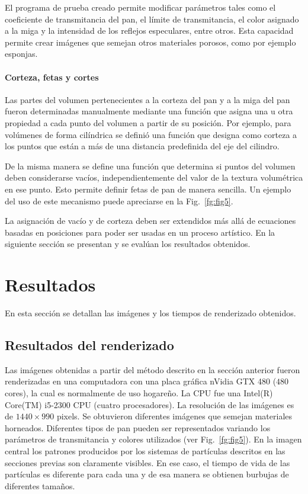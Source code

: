 \documentclass[oneside,a4paper,spanish,links]{amca}
\begin{document}
El programa de prueba creado permite modificar parámetros tales como
el coeficiente de transmitancia del pan, el límite de transmitancia,
el color asignado a la miga y la intensidad de los reflejos especulares,
entre otros. Esta capacidad permite crear imágenes que semejan otros
materiales porosos, como por ejemplo esponjas.

\paragraph{Corteza, fetas y cortes}

Las partes del volumen pertenecientes a la corteza del pan y a la miga
del pan fueron determinadas manualmente mediante una función que
asigna una u otra propiedad a cada punto del volumen a partir de su
posición. Por ejemplo, para volúmenes de forma cilíndrica se definió
una función que designa como corteza a los puntos que están a más de
una distancia predefinida del eje del cilindro.

De la misma manera se define una función que determina si puntos del
volumen deben considerarse vacíos, independientemente del valor de la
textura volumétrica en ese punto. Esto permite definir fetas de pan de
manera sencilla. Un ejemplo del uso de este mecanismo puede apreciarse
en la Fig.~\ref{fg:fig5}.

La asignación de vacío y de corteza deben ser extendidos más
allá de ecuaciones basadas en posiciones para poder ser usadas en un
proceso artístico. En la siguiente sección
se presentan y se evalúan los resultados obtenidos.


\section{Resultados}

En esta sección se detallan las imágenes y los tiempos de
renderizado obtenidos. 

\subsection{Resultados del renderizado}

Las imágenes obtenidas a partir del método descrito en la
sección anterior fueron renderizadas en una computadora con una placa
gráfica nVidia GTX 480 ($480$ cores), la cual es normalmente de uso
hogareño. La CPU fue una Intel(R) Core(TM) i5-2300 CPU (cuatro
procesadores). La resolución de las imágenes es de $1440\times990$
pixels. 
Se obtuvieron diferentes imágenes que semejan materiales
horneados. Diferentes tipos de pan pueden ser representados variando los parámetros de transmitancia y colores utilizados (ver
Fig.~\ref{fg:fig5}). En la imagen central los patrones producidos
por los sistemas de partículas descritos en las secciones previas son
claramente visibles. En ese caso, el tiempo de vida de las partículas
es diferente para cada una y de esa manera se obtienen burbujas de
diferentes tamaños.
\end{document}
